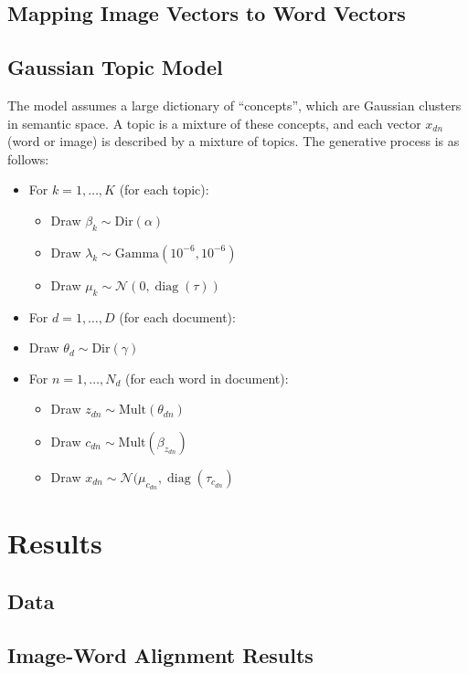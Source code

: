 \documentclass[11pt]{article}
\DeclareMathOperator{\diag}{diag}
\begin{document}
\subsection{Mapping Image Vectors to Word Vectors}

\subsection{Gaussian Topic Model}
The model assumes a large dictionary of ``concepts'', which are Gaussian clusters in semantic space. A topic is a mixture of these concepts, and each vector $x_{dn}$ (word or image) is described by a mixture of topics. The generative process is as follows:
\begin{itemize}
\item For $k = 1, \ldots, K$ (for each topic):
  \begin{itemize}
    \item Draw $\beta_k \sim \mbox{Dir}(\alpha)$
    \item Draw $\lambda_k \sim \mbox{Gamma}(10^{-6}, 10^{-6})$
    \item Draw $\mu_k \sim \mathcal{N}(0, \diag(\tau))$
  \end{itemize}
\item For $d = 1, \ldots, D$ (for each document):
  \item Draw $\theta_d \sim \mbox{Dir}(\gamma)$
  \item For $n = 1, \ldots, N_d$ (for each word in document):
  \begin{itemize}
    \item Draw $z_{dn} \sim \mbox{Mult}(\theta_{dn})$
    \item Draw $c_{dn} \sim \mbox{Mult}(\beta_{z_{dn}})$
    \item Draw $x_{dn} \sim \mathcal{N}(\mu_{c_{dn}}, \diag(\tau_{c_{dn}})$
  \end{itemize}
\end{itemize}

\section{Results}

\subsection{Data}
\label{sec:data}

\subsection{Image-Word Alignment Results}
\end{document}
